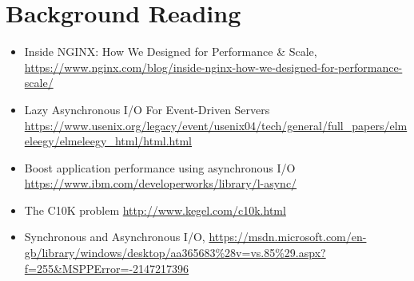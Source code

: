 \documentclass{article}
\begin{document}
\section{Background Reading}
\begin{itemize}
\item
Inside NGINX: How We Designed for Performance \& Scale, 
\url{https://www.nginx.com/blog/inside-nginx-how-we-designed-for-performance-scale/}

\item
Lazy Asynchronous I/O For Event-Driven Servers
\url{https://www.usenix.org/legacy/event/usenix04/tech/general/full_papers/elmeleegy/elmeleegy_html/html.html}

\item
Boost application performance using asynchronous I/O
\url{https://www.ibm.com/developerworks/library/l-async/}

\item
The C10K problem
\url{http://www.kegel.com/c10k.html}

\item
Synchronous and Asynchronous I/O, \url{https://msdn.microsoft.com/en-gb/library/windows/desktop/aa365683%28v=vs.85%29.aspx?f=255&MSPPError=-2147217396}
\end{itemize}

\begin{comment}
\section{Interim Log}
\end{comment}
\end{document}
